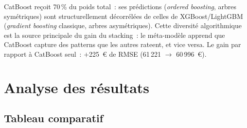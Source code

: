 \documentclass[12pt,a4paper]{article}
\begin{document}
\begin{descrbox}
CatBoost re\c{c}oit 70\,\% du poids total~: ses pr\'edictions (\textit{ordered boosting}, arbres sym\'etriques) sont structurellement d\'ecorr\'el\'ees de celles de XGBoost/LightGBM (\textit{gradient boosting} classique, arbres asym\'etriques). Cette diversit\'e algorithmique est la source principale du gain du stacking~: le m\'eta-mod\`ele apprend que CatBoost capture des patterns que les autres rateent, et vice versa. Le gain par rapport \`a CatBoost seul~: $+$225~\euro{} de RMSE (61\,221 $\to$ 60\,996~\euro).
\end{descrbox}

\newpage
\section{Analyse des r\'esultats}
\label{sec:resultats}

\subsection{Tableau comparatif}
\end{document}
